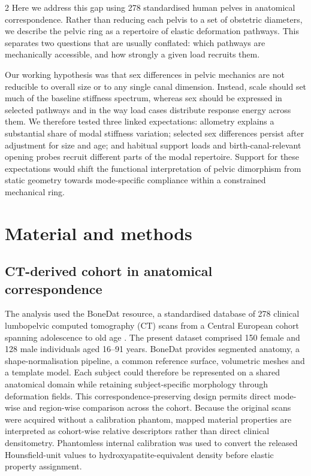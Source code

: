 \documentclass[openacc]{rsproca_new}
\begin{document}
\begin{multicols}{2}
Here we address this gap using 278 standardised human pelves in anatomical correspondence. Rather than reducing each pelvis to a set of obstetric diameters, we describe the pelvic ring as a repertoire of elastic deformation pathways. This separates two questions that are usually conflated: which pathways are mechanically accessible, and how strongly a given load recruits them.

Our working hypothesis was that sex differences in pelvic mechanics are not reducible to overall size or to any single canal dimension. Instead, scale should set much of the baseline stiffness spectrum, whereas sex should be expressed in selected pathways and in the way load cases distribute response energy across them. We therefore tested three linked expectations: allometry explains a substantial share of modal stiffness variation; selected sex differences persist after adjustment for size and age; and habitual support loads and birth-canal-relevant opening probes recruit different parts of the modal repertoire. Support for these expectations would shift the functional interpretation of pelvic dimorphism from static geometry towards mode-specific compliance within a constrained mechanical ring.

\section{Material and methods}

\subsection{CT-derived cohort in anatomical correspondence}

The analysis used the BoneDat resource, a standardised database of 278 clinical lumbopelvic computed tomography (CT) scans from a Central European cohort spanning adolescence to old age \cite{HenysKuchar2025}. The present dataset comprised 150 female and 128 male individuals aged 16--91 years. BoneDat provides segmented anatomy, a shape-normalisation pipeline, a common reference surface, volumetric meshes and a template model. Each subject could therefore be represented on a shared anatomical domain while retaining subject-specific morphology through deformation fields. This correspondence-preserving design permits direct mode-wise and region-wise comparison across the cohort. Because the original scans were acquired without a calibration phantom, mapped material properties are interpreted as cohort-wise relative descriptors rather than direct clinical densitometry. Phantomless internal calibration was used to convert the released Hounsfield-unit values to hydroxyapatite-equivalent density before elastic property assignment.


\end{multicols}
\end{document}

